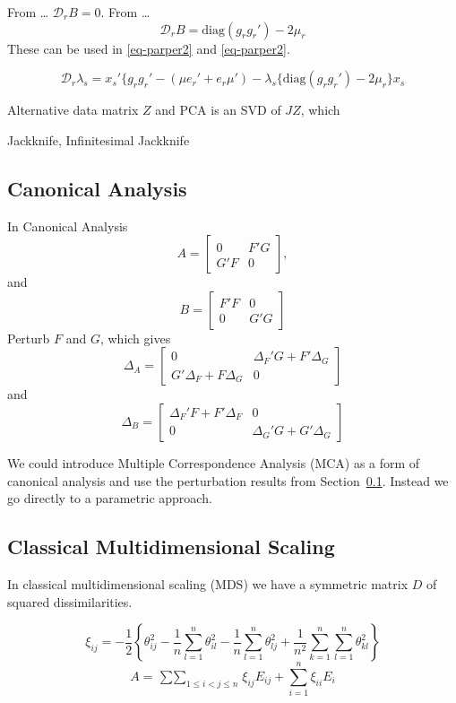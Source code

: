 \documentclass[
  12pt,
  letterpaper,
  DIV=11,
  numbers=noendperiod]{scrartcl}
\begin{document}
From \ldots{} \(\mathcal{D}_rB=0\). From \ldots{} \[
\mathcal{D}_rB=\text{diag}(g_rg_r')-2\mu_r
\] These can be used in \eqref{eq-parper2} and \eqref{eq-parper2}.

\[
\mathcal{D}_r\lambda_s=
x_s'\{g_rg_r'-(\mu e_r'+e_r\mu')-\lambda_s\{\text{diag}(g_rg_r')-2\mu_r\}x_s
\]

Alternative data matrix \(Z\) and PCA is an SVD of \(JZ\), which

Jackknife, Infinitesimal Jackknife

\subsection{Canonical Analysis}\label{sec-canonical}

In Canonical Analysis \[
A=\begin{bmatrix}
0&F'G\\
G'F&0
\end{bmatrix},
\] and \[
B=\begin{bmatrix}
F'F&0\\
0&G'G
\end{bmatrix}
\] Perturb \(F\) and \(G\), which gives \[
\Delta_A=\begin{bmatrix}
0&\Delta_F'G+F'\Delta_G\\
G'\Delta_F+F\Delta_G&0
\end{bmatrix}
\] and \[
\Delta_B=\begin{bmatrix}
\Delta_F'F+F'\Delta_F&0\\
0&\Delta_G'G+G'\Delta_G
\end{bmatrix}
\]

We could introduce Multiple Correspondence Analysis (MCA) as a form of
canonical analysis and use the perturbation results from
Section~\ref{sec-canonical}. Instead we go directly to a parametric
approach.

\subsection{Classical Multidimensional
Scaling}\label{classical-multidimensional-scaling}

In classical multidimensional scaling (MDS) we have a symmetric matrix
\(D\) of squared dissimilarities.

\[
\xi_{ij}=-\frac12\left\{\theta_{ij}^2-\frac{1}{n}\sum_{l=1}^n\theta_{il}^2-\frac{1}{n}\sum_{l=1}^n\theta_{lj}^2
+\frac{1}{n^2}\sum_{k=1}^n\sum_{l=1}^n\theta_{kl}^2\right\}
\] \[
A=\mathop{\sum\sum}_{1\leq i<j\leq n}\xi_{ij}E_{ij}+\sum_{i=1}^n\xi_{ii}E_i
\]
\end{document}
